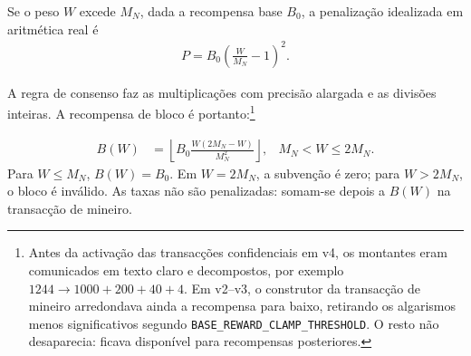 Se o peso $W$ excede $M_N$, dada a recompensa base $B_0$, a penalização
idealizada em aritmética real é
\begin{align*}
P=B_0\left(\frac{W}{M_N}-1\right)^2.
\end{align*}

%
A regra de consenso faz as multiplicações com precisão alargada e as divisões
inteiras. A recompensa de bloco é portanto:\footnote{Antes da activação das
transacções confidenciais em v4, os montantes eram comunicados em texto claro e
decompostos, por exemplo $1244\rightarrow1000+200+40+4$. Em v2--v3, o
construtor da transacção de mineiro arredondava ainda a recompensa para baixo,
retirando os algarismos menos significativos segundo
{\tt BASE\_REWARD\_CLAMP\_THRESHOLD}. O resto não desaparecia: ficava
disponível para recompensas posteriores.}



\begin{align*}
B(W)&=\left\lfloor
       B_0\frac{W(2M_N-W)}{M_N^2}
      \right\rfloor,
& M_N<W\leq2M_N.
\end{align*}
Para $W\leq M_N$, $B(W)=B_0$. Em $W=2M_N$, a subvenção é zero; para
$W>2M_N$, o bloco é inválido. As taxas não são penalizadas: somam-se depois a
$B(W)$ na transacção de mineiro.

